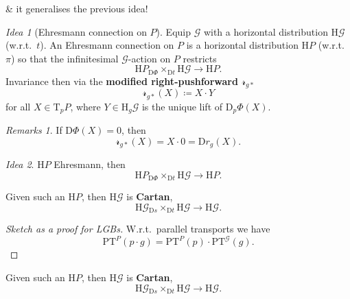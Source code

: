 \documentclass[
aspectratio=3218, 
10pt
]{beamer}
\newcommand\fibtimes[2]{\mathbin{_{#1}\times_{#2}}}
\def\bes{\begin{equation*}}
\def\ees{\end{equation*}}
\theoremstyle{plain}
\theoremstyle{remark}
\newtheorem*{remark}{Remarks}
\newtheorem*{idea}{Idea}
\begin{document}
{\begin{frame}{\& it generalises the previous idea!}
\begin{idea}[Ehresmann connection on $P$]
Equip $\mathcal{G}$ with a horizontal distribution $\mathup{H}\mathcal{G}$ (w.r.t.\ $t$). An Ehresmann connection on $P$ is a horizontal distribution $\mathup{H}P$ (w.r.t.\ $\pi$) so that the infinitesimal $\mathcal{G}$-action on $P$ restricts 
\bes
\mathup{H}P \fibtimes{\mathup{D}\Phi}{\mathup{D}t} \mathup{H}\mathcal{G}
\to 
\mathup{H}P.
\ees
Invariance then via the \textbf{modified right-pushforward $\mathcal{r}_{g*}$}
\bes
\mathcal{r}_{g*}(X) \coloneqq X \cdot Y
\ees
for all $X \in \mathup{T}_pP$, where $Y \in \mathup{H}_g\mathcal{G}$ is the unique lift of $\mathup{D}_p\Phi(X)$.
\end{idea}

\begin{remark}
If $\mathup{D}\Phi(X) = 0$, then
\bes
\mathcal{r}_{g*}(X) = X \cdot 0 = \mathup{D}r_g(X).
\ees
\end{remark}
\end{frame}

\begin{frame}
\begin{idea}
$\mathup{H}P$ Ehresmann, then
\bes
\mathup{H}P \fibtimes{\mathup{D}\Phi}{\mathup{D}t} \mathup{H}\mathcal{G}
\to 
\mathup{H}P.
\ees
\end{idea}

\begin{theorem}\vspace{.5pt}
Given such an $\mathup{H}P$, then $\mathup{H}\mathcal{G}$ is \textbf{Cartan},
\bes
\mathup{H}\mathcal{G} \fibtimes{\mathup{D}s}{\mathup{D}t} \mathup{H}\mathcal{G}
\to 
\mathup{H}\mathcal{G}.
\ees
\end{theorem}
\pause
\begin{proof}[Sketch as a proof for LGBs]\vspace{.5pt}
W.r.t.\ parallel transports we have
\bes
\mathup{PT}^P(p\cdot g) = \mathup{PT}^P(p) \cdot \mathup{PT}^{\mathcal{G}}(g).
\ees
\end{proof}
\end{frame}

\begin{frame}
\begin{theorem}\vspace{.5pt}
Given such an $\mathup{H}P$, then $\mathup{H}\mathcal{G}$ is \textbf{Cartan},
\bes
\mathup{H}\mathcal{G} \fibtimes{\mathup{D}s}{\mathup{D}t} \mathup{H}\mathcal{G}
\to 
\mathup{H}\mathcal{G}.
\ees
\end{theorem}


\end{frame}}
\end{document}

